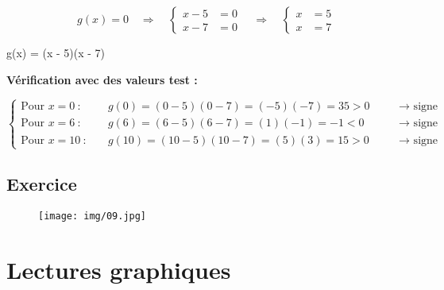 \documentclass[a4paper,12pt]{article}
\begin{document}
   \[
g(x) = 0 \quad\Rightarrow \quad
\left\{
\begin{aligned}
x - 5 &= 0 \\
x - 7 &= 0
\end{aligned}
\right.
\quad\Rightarrow\quad
\left\{
\begin{aligned}
x &= 5 \\
x &= 7
\end{aligned}
\right.
\]


 g(x) = (x - 5)(x - 7)

\vspace{1em}
    
    
    \vspace{1em}
    
    \textbf{Vérification avec des valeurs test :}

    \[
\left\{
\begin{aligned}
\text{Pour } x = 0\ :\quad & g(0) = (0 - 5)(0 - 7) = (-5)(-7) = 35 > 0 \quad &&\text{→ signe positif confirmé.} \\
\text{Pour } x = 6\ :\quad & g(6) = (6 - 5)(6 - 7) = (1)(-1) = -1 < 0 \quad &&\text{→ signe négatif confirmé.} \\
\text{Pour } x = 10\ :\quad & g(10) = (10 - 5)(10 - 7) = (5)(3) = 15 > 0 \quad &&\text{→ signe positif confirmé.}
\end{aligned}
\right.
\]

\subsection*{Exercice}

\begin{figure}[H]
    \centering
    \texttt{[image: img/09.jpg]}
  \end{figure}

\section*{Lectures graphiques}
\end{document}
